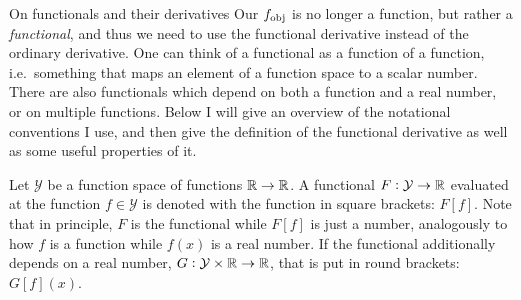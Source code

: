 \begin{mybox}[breakable, parbox=false, label=box:functionals]{On functionals and their derivatives}
Our $f_\text{obj}$ is no longer a function, but rather a \emph{functional}, and thus
we need to use the functional derivative instead of the ordinary derivative.
One can think of a functional as a function of a function,
i.e.\ something that maps an element of a function space to a scalar number.
There are also functionals which depend on both a function and a real number,
or on multiple functions.
Below I will give an overview of the notational conventions I use,
and then give the definition of the functional derivative as well as some useful
properties of it.

Let $\mathcal{Y}$ be a function space of functions $\mathbb{R} \to \mathbb{R}$.
A functional $F:\mathcal{Y} \to \mathbb{R}$ evaluated at the function
$f\in\mathcal{Y}$
is denoted with the function in square brackets: $F[f]$.
Note that in principle, $F$ is the functional while $F[f]$ is just a
number,
analogously to how $f$ is a function while $f(x)$ is a real number.
If the functional additionally depends on a real number,
$G:\mathcal{Y} \times \mathbb{R} \to \mathbb{R}$,
that is put in round brackets: $G[f](x)$.


\end{mybox}
